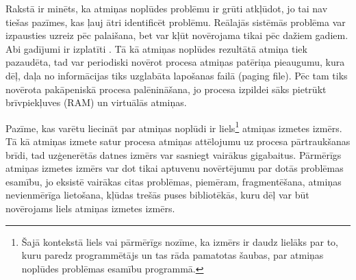 Rakstā \cite{RHBJ} ir minēts, ka atmiņas noplūdes problēmu ir grūti atkļūdot, jo tai nav tiešas pazīmes, kas ļauj ātri identificēt problēmu.
Reālajās sistēmās problēma var izpausties uzreiz pēc palaišana, bet var kļūt novērojama tikai pēc dažiem gadiem. Abi gadījumi ir izplatīti \cite{HTTM}.
Tā kā atmiņas noplūdes rezultātā atmiņa tiek pazaudēta, tad var periodiski novērot procesa atmiņas patēriņa pieaugumu, kura dēļ, daļa no informācijas tiks uzglabāta lapošanas failā (paging file).
Pēc tam tiks novērota pakāpeniskā procesa palēnināšana, jo procesa izpildei sāks pietrūkt brīvpiekļuves (RAM) un virtuālās atmiņas.

Pazīme, kas varētu liecināt par atmiņas noplūdi ir liels\footnote{Šajā kontekstā liels vai pārmērīgs nozīme, ka izmērs ir daudz lielāks par to, kuru paredz programmētājs un tas rāda pamatotas šaubas, par atmiņas noplūdes problēmas esamību programmā.} atmiņas izmetes izmērs.
Tā kā atmiņas izmete satur procesa atmiņas attēlojumu uz procesa pārtraukšanas brīdi, tad uzģenerētās datnes izmērs var sasniegt vairākus gigabaitus.
Pārmērīgs atmiņas izmetes izmērs var dot tikai aptuvenu novērtējumu par dotās problēmas esamību, jo eksistē vairākas citas problēmas, piemēram, fragmentēšana, atmiņas nevienmērīga lietošana, kļūdas trešās puses bibliotēkās, kuru dēļ var būt novērojams liels atmiņas izmetes izmērs.



